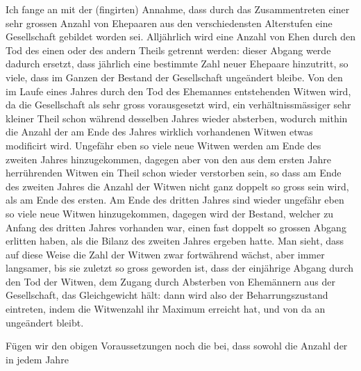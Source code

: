 \noindent\hspace*{\parindent}Ich fange an mit der (fingirten) Annahme, dass durch das Zusammentreten einer sehr grossen Anzahl von Ehepaaren aus den verschiedensten Alterstufen eine Gesellschaft gebildet worden sei. Alljährlich wird eine Anzahl von Ehen durch den Tod des einen oder des andern Theils getrennt werden: dieser Abgang werde dadurch ersetzt, dass jährlich eine bestimmte Zahl neuer Ehepaare hinzutritt, so viele, dass im Ganzen der Bestand der Gesellschaft ungeändert bleibe. Von den im Laufe eines Jahres durch den Tod des Ehemannes entstehenden Witwen wird, da die Gesellschaft als sehr gross vorausgesetzt wird, ein verhältnissmässiger sehr kleiner Theil schon während desselben Jahres wieder absterben, wodurch mithin die Anzahl der am Ende des Jahres wirklich vorhandenen Witwen etwas modificirt wird. Ungefähr eben so viele neue Witwen werden am Ende des zweiten Jahres hinzugekommen, dagegen aber von den aus dem ersten Jahre herrührenden Witwen ein Theil schon wieder verstorben sein, so dass am Ende des zweiten Jahres die Anzahl der Witwen nicht ganz doppelt so gross sein wird, als am Ende des ersten. Am Ende des dritten Jahres sind wieder ungefähr eben so viele neue Witwen hinzugekommen, dagegen wird der Bestand, welcher zu Anfang des dritten Jahres vorhanden war, einen fast doppelt so grossen Abgang erlitten haben, als die Bilanz des zweiten Jahres ergeben hatte. Man sieht, dass auf diese Weise die Zahl der Witwen zwar fortwährend wächst, aber immer langsamer, bis sie zuletzt so gross geworden ist, dass der einjährige Abgang durch den Tod der Witwen, dem Zugang durch Absterben von Ehemännern aus der Gesellschaft, das Gleichgewicht hält: dann wird also der Beharrungszustand eintreten, indem die Witwenzahl ihr Maximum erreicht hat, und von da an ungeändert bleibt.

Fügen wir den obigen Voraussetzungen noch die bei, dass sowohl die Anzahl der in jedem Jahre
